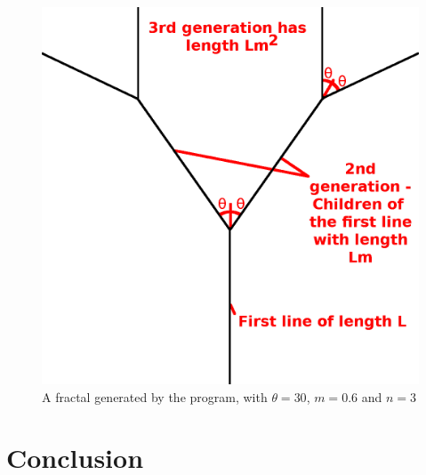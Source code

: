 \documentclass[11pt]{article}
\begin{document}
\begin{figure}[t]
	\label{general explanation}
	\includegraphics[width=\linewidth]{Images/GeneralExplanation.png}
	\centering
	\caption{A fractal generated by the program, with $\theta=30$, $m=0.6$ and $n=3$}
\end{figure}

	

\section{Conclusion}

\pagebreak

%
%

\pagebreak

%
\end{document}
